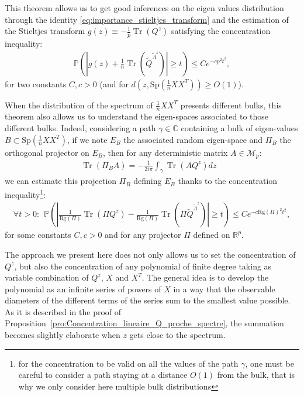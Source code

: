 \documentclass{ws-rmta}
\DeclareMathOperator{\tr}{Tr}
\begin{document}
This theorem allows us to get good inferences on the eigen values distribution through the identity \eqref{eq:importance_stieltjes_transform} and the estimation of the Stieltjes transform $g(z) \equiv -\frac{1}{p} \tr (Q^z) $ satisfying the concentration inequality:
\begin{align*}
  \mathbb P \left( \left\vert g(z) + \frac{1}{n} \tr \left( \tilde Q^{\tilde \Lambda^z} \right) \right\vert \geq t \right)\leq Ce^{-c p^2 t^2},
\end{align*}
for two constants $C,c>0$ (and for $d(z, \text{Sp}(\frac{1}{n}XX^T)) \geq O(1)$).

When the distribution of the spectrum of $\frac{1}{n}XX^T$ presents different bulks, this theorem also allows us to understand the eigen-spaces associated to those different bulks. Indeed, considering a path $\gamma \in \mathbb C$ containing a bulk of eigen-values $B \subset \text{Sp}(\frac{1}{n}XX^T)$, if we note $E_B$ the associated random eigen-space and $\Pi_B$ the orthogonal projector on $E_B$, then for any deterministic matrix $A \in \mathcal M_{p}$:
 \begin{align}\label{eq:estimation_eigenspaces}
   \tr(\Pi_BA) = -\frac{1}{2i\pi}\int_\gamma \tr(AQ^z) dz&
 \end{align}
  we can estimate this projection $\Pi_B$ defining $E_B$ thanks to the concentration inequality\footnote{for the concentration to be valid on all the values of the path $\gamma$, one must be careful to consider a path staying at a distance $O(1)$ from the bulk, that is why we only consider here multiple bulk distributions}:
\begin{align*}
  \forall t >0 : \ \ \mathbb P \left( \left\vert \frac{1}{\text{Rg}(\Pi)} \tr(\Pi Q^z) - \frac{1}{\text{Rg}(\Pi)} \tr \left( \Pi\tilde Q^{\tilde \Lambda^z} \right) \right\vert \geq t \right) \leq Ce^{-c\text{Rg}(\Pi)^2t^2},
\end{align*}
for some constants $C,c>0$ and for any projector $\Pi$ defined on $\mathbb R^p$.

The approach we present here does not only allows us to set the concentration of $Q^z$, but also the concentration of any polynomial of finite degree taking as variable combination of $Q^z$, $X$ and $X^T$. The general idea is to develop the polynomial as an infinite series of powers of $X$ in a way that the observable diameters of the different terms of the series sum to the smallest value possible. As it is described in the proof of Proposition~\ref{pro:Concentration_lineaire_Q_proche_spectre}, the summation becomes slightly elaborate when $z$ gets close to the spectrum.
\end{document}
